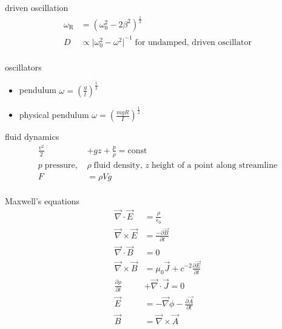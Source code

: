 \documentclass[avery5388, frame, grid]{flashcards}
\begin{document}
\begin{flashcard}{driven oscillation}
  {
    \begin{align*}
      \omega_{\textrm{R}} &= (\omega_{0}^{2} - 2 \beta^{2})^{\frac{1}{2}}\\
      D &\propto {\vert \omega_{0}^{2} - \omega^{2} \vert}^{-1} \; \textrm{for undamped, driven oscillator}\\
    \end{align*}
  }
\end{flashcard}

\begin{flashcard}{oscillators}
  {
    \begin{itemize}
    \item pendulum $\omega = (\frac{g}{l})^{\frac{1}{2}}$
    \item physical pendulum $\omega = (\frac{mgR}{I})^{\frac{1}{2}}$
    \end{itemize}
  }
\end{flashcard}

\begin{flashcard}{fluid dynamics}
  {
    \begin{align*}
      \frac{v^2}{2} &+ g z + \frac{p}{\rho} = \textrm{const}\\
      p \; \textrm{pressure, } &\rho \; \textrm{fluid density, } z \; \textrm{height of a point along streamline}\\
      F & = \rho V g\\
    \end{align*}
  }
\end{flashcard}

\begin{flashcard}{Maxwell's equations}
  {
    \begin{align*}
      \vec{\nabla} \cdot \vec{E} &= \frac{\rho}{\epsilon_{0}}\\
      \vec{\nabla} \times \vec{E} &= \frac{- \partial \vec{B}}{\partial t}\\
      \vec{\nabla} \cdot \vec{B} &= 0\\
      \vec{\nabla} \times \vec{B} &= \mu_{0} \vec{J} + c^{-2} \frac{\partial \vec{E}}{\partial t}\\
      \frac{\partial \rho}{\partial t} &+ \vec{\nabla} \cdot \vec{J} = 0\\
      \vec{E} &= - \vec{\nabla} \phi - \frac{\partial \vec{A}}{\partial t}\\
      \vec{B} &= \vec{\nabla} \times \vec{A}\\
    \end{align*}
  }
\end{flashcard}
\end{document}
